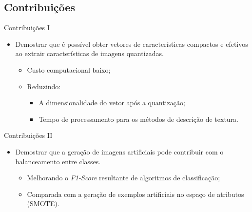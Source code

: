 \documentclass[10pt]{beamer}
\begin{document}
\subsection{Contribuições}
%
\begin{frame}{Contribuições I}
  \setlength\leftmargini{1em}
    \begin{itemize}
    \item Demostrar que é possível obter vetores de características compactos e efetivos ao extrair características de imagens quantizadas.
    \begin{itemize}
      \item Custo computacional baixo;
      \item Reduzindo:
      \begin{itemize}
        \item A dimensionalidade do vetor após a quantização;
        \item Tempo de processamento para os métodos de descrição de textura.
      \end{itemize}
    \end{itemize}
  \end{itemize}
\end{frame}
\begin{frame}{Contribuições II}
  \setlength\leftmargini{1em}
    \begin{itemize}
    \item Demostrar que a geração de imagens artificiais pode contribuir com o balanceamento entre classes.
    \begin{itemize}
      \item Melhorando o \textit{F1-Score} resultante de algoritmos de classificação;
      \item Comparada com a geração de exemplos artificiais no espaço de atributos (SMOTE).
    \end{itemize}
  \end{itemize}
\end{frame}
\end{document}
